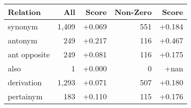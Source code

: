 \begin{tabular}{lrrrr}
Relation & All & Score & Non-Zero & Score \\ \hline
synonym & 1,409 & +0.069 & 551 & +0.184\\
antonym & 249 & +0.217 & 116 & +0.467\\
ant opposite & 249 & +0.081 & 116 & +0.175\\
also & 1 & +0.000 & 0 & +nan\\
derivation & 1,293 & +0.071 & 507 & +0.180\\
pertainym & 183 & +0.110 & 115 & +0.176\\
\end{tabular}
